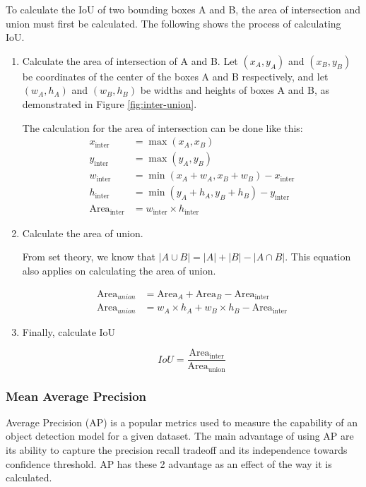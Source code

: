   To calculate the IoU of two bounding boxes A and B, the area of intersection and union must first
  be calculated. The following shows the process of calculating IoU.
  \begin{enumerate}[topsep=0pt]
    \item Calculate the area of intersection of A and B. 
    Let $(x_A,y_A)$ and $(x_B,y_B)$ be coordinates of the center of the boxes A and B respectively,
    and let $(w_A,h_A)$ and $(w_B,h_B)$ be widths and heights of boxes A and B, as demonstrated in Figure \ref{fig:inter-union}.

    The calculation for the area of intersection can be done like this:
    \begin{align*}
      x_{\text{{inter}}} &= \max(x_A, x_B) \\
      y_{\text{{inter}}} &= \max(y_A, y_B) \\
      w_{\text{{inter}}} &= \min(x_A + w_A, x_B + w_B) - x_{\text{{inter}}} \\
      h_{\text{{inter}}} &= \min(y_A + h_A, y_B + h_B) - y_{\text{{inter}}} \\
      \text{Area}_{\text{inter}} &= w_{\text{{inter}}} \times h_{\text{{inter}}}
    \end{align*}

    \item Calculate the area of union.

    From set theory, we know that $|A \cup B| =|A| + |B| - |A \cap B| $.
    This equation also applies on calculating the area of union.

    \begin{align*}
      \text{Area}_{union} &= \text{Area}_A + \text{Area}_B - \text{Area}_{\text{inter}}\\
      \text{Area}_{union} &= w_A\times h_A + w_B\times h_B  - \text{Area}_{\text{inter}}
    \end{align*}

    \item Finally, calculate IoU

    \begin{equation}
      IoU = \frac{\text{Area}_{\text{inter}}}{\text{Area}_{\text{union}}}
    \end{equation}
  \end{enumerate} 

  

  \subsubsection{Mean Average Precision}
  Average Precision (AP) is a popular metrics used to measure the capability of an object detection model
  for a given dataset. The main advantage of using AP are its ability to capture the precision recall
  tradeoff and its independence towards confidence threshold. AP has these 2 advantage as an effect of the way 
  it is calculated.

